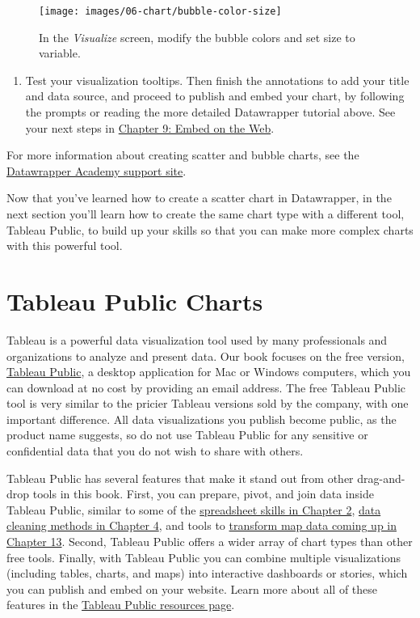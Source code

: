 \documentclass[
  english,
]{book}
\providecommand{\tightlist}{%
  \setlength{\itemsep}{0pt}\setlength{\parskip}{0pt}}
\begin{document}
\begin{figure}
\texttt{[image: images/06-chart/bubble-color-size]} \caption{In the \emph{Visualize} screen, modify the bubble colors and set size to variable.}\label{fig:bubble-color-size}
\end{figure}

\begin{enumerate}
\def\labelenumi{\arabic{enumi}.}
\setcounter{enumi}{5}
\tightlist
\item
  Test your visualization tooltips. Then finish the annotations to add your title and data source, and proceed to publish and embed your chart, by following the prompts or reading the more detailed Datawrapper tutorial above. See your next steps in \href{embed.html}{Chapter 9: Embed on the Web}.
\end{enumerate}

For more information about creating scatter and bubble charts, see the \href{https://academy.datawrapper.de/}{Datawrapper Academy support site}.

Now that you've learned how to create a scatter chart in Datawrapper, in the next section you'll learn how to create the same chart type with a different tool, Tableau Public, to build up your skills so that you can make more complex charts with this powerful tool.

\hypertarget{chart-tableau}{%
\section*{Tableau Public Charts}\label{chart-tableau}}

Tableau is a powerful data visualization tool used by many professionals and organizations to analyze and present data. Our book focuses on the free version, \href{https://public.tableau.com}{Tableau Public}, a desktop application for Mac or Windows computers, which you can download at no cost by providing an email address. The free Tableau Public tool is very similar to the pricier Tableau versions sold by the company, with one important difference. All data visualizations you publish become public, as the product name suggests, so do not use Tableau Public for any sensitive or confidential data that you do not wish to share with others.

Tableau Public has several features that make it stand out from other drag-and-drop tools in this book. First, you can prepare, pivot, and join data inside Tableau Public, similar to some of the \href{spreadsheet.html}{spreadsheet skills in Chapter 2}, \href{clean.html}{data cleaning methods in Chapter 4}, and tools to \href{transform.html}{transform map data coming up in Chapter 13}. Second, Tableau Public offers a wider array of chart types than other free tools. Finally, with Tableau Public you can combine multiple visualizations (including tables, charts, and maps) into interactive dashboards or stories, which you can publish and embed on your website. Learn more about all of these features in the \href{https://public.tableau.com/en-us/s/resources}{Tableau Public resources page}.
\end{document}
